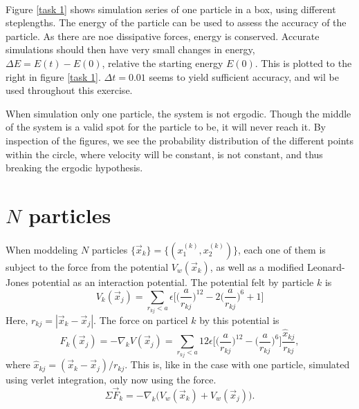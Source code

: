\documentclass{article}
\begin{document}
        \paragraph*{}
        Figure \ref{task 1} shows simulation series of one particle in a box, using different steplengths. The energy of the particle can be used to assess the accuracy of the particle. As there are noe dissipative forces, energy is conserved. Accurate simulations should then have very small changes in energy, $\Delta E = E(t) - E(0)$, relative the starting energy $E(0)$. This is plotted to the right in figure \ref{task 1}. $\Delta t = 0.01$ seems to yield sufficient accuracy, and wil be used throughout this exercise.

        When simulation only one particle, the system is not ergodic. Though the middle of the system is a valid spot for the particle to be, it will never reach it. By inspection of the figures, we see the probability distribution of the different points within the circle, where velocity will be constant, is not constant, and thus breaking the ergodic hypothesis.
        

    \section*{$N$ particles}
        When moddeling $N$ particles $\{ \vec x_k\} = \{ (x_1^{(k)}, x_2^{(k)}) \}$, each one of them is subject to the force from the potential $V_w(\vec x_k)$, as well as a modified Leonard-Jones potential as an interaction potential. The potential felt by particle $k$ is
        \begin{equation*}
            V_k(\vec x_j) = 
            \sum_{r_{kj}<a}\epsilon \bigg[ \bigg( \frac{a}{r_{kj}}\bigg)^{12} - 2\bigg(\frac{a}{r_{kj}}\bigg)^{6} + 1 \bigg]
        \end{equation*}
        Here, $r_{kj} = |\vec x_k - \vec x_j|$. The force on particel $k$ by this potential is
        \begin{equation*}
            F_k (\vec x_j) = -\nabla_k V(\vec x_j) = \sum_{r_{kj}<a} 12 \epsilon \bigg[ \bigg( \frac{a}{r_{kj}}\bigg)^{12} - \bigg(\frac{a}{r_{kj}}\bigg)^{6}\bigg] \frac{\hat x_{kj}}{r_{kj}},
        \end{equation*}
        where $\hat x_{kj} = (\vec x_k - \vec x_j) / r_{kj}$. This is, like in the case with one particle, simulated using verlet integration, only now using the force.
        \begin{equation*}
            \Sigma \vec F_k = -\nabla_k \big( V_w(\vec x_k) + V_w(\vec x_j) \big).
        \end{equation*}
\end{document}
